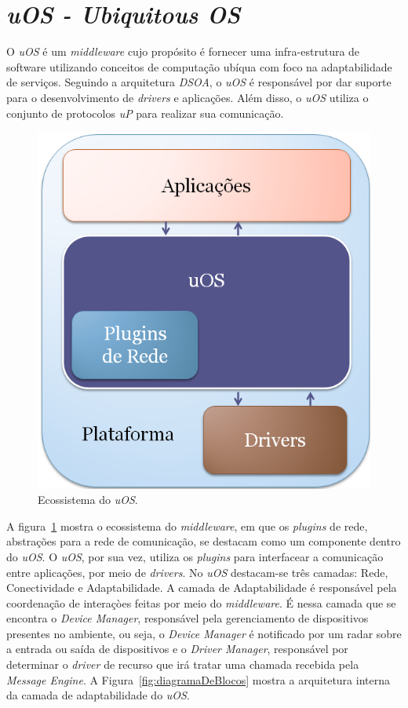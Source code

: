 \section{\emph{uOS - Ubiquitous OS}}

O \emph{uOS} é um \emph{middleware} cujo propósito é fornecer uma infra-estrutura de software utilizando conceitos de computação ubíqua com foco na adaptabilidade de serviços. Seguindo a arquitetura \emph{DSOA}, o \emph{uOS} é responsável por dar suporte para o desenvolvimento de \emph{drivers} e aplicações. Além disso, o \emph{uOS} utiliza o conjunto de protocolos \emph{uP} para realizar sua comunicação.

\begin{figure}[ht]
	\center
	\includegraphics[scale=0.4]{imagens/ecossistemaUbiquitos}
	\caption{Ecossistema do \emph{uOS}.}
	\label{fig:ecossistemaUbiquitos}
\end{figure}

A figura~\ref{fig:ecossistemaUbiquitos} mostra o ecossistema do \emph{middleware}, em que os \emph{plugins} de rede, abstrações para a rede de comunicação, se destacam como um componente dentro do \emph{uOS}. O \emph{uOS}, por sua vez, utiliza os \emph{plugins} para interfacear a comunicação entre aplicações, por meio de \emph{drivers}. No \emph{uOS} destacam-se três camadas: Rede, Conectividade e Adaptabilidade. A camada de Adaptabilidade é responsável pela coordenação de interaçòes feitas por meio do \emph{middleware}. É nessa camada que se encontra o \emph{Device Manager}, responsável pela gerenciamento de dispositivos presentes no ambiente, ou seja, o \emph{Device Manager} é notificado por um radar sobre a entrada ou saída de dispositivos e o \emph{Driver Manager}, responsável por determinar o \emph{driver} de recurso que irá tratar uma chamada recebida pela \emph{Message Engine}. A Figura~\ref{fig:diagramaDeBlocos} mostra a arquitetura interna da camada de adaptabilidade do \emph{uOS}.

